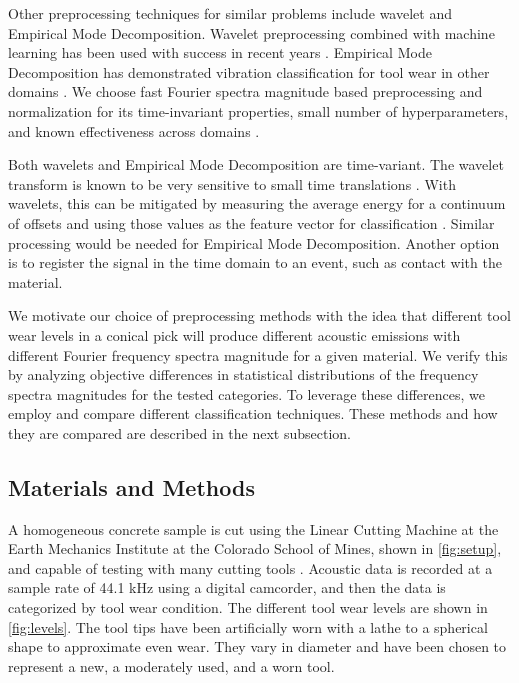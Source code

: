 Other preprocessing techniques for similar problems include wavelet and Empirical Mode Decomposition.
Wavelet preprocessing combined with machine learning
has been used with success in recent years 
 \cite{he2013vibration, sadegh2016classification, skariah2021health}.
Empirical Mode Decomposition has demonstrated vibration classification for tool wear
 in other domains \cite{Xu2009, Nie2011, Zhan2014}.
We choose fast Fourier spectra magnitude based preprocessing and normalization for its time-invariant properties,
small number of hyperparameters, and known effectiveness across domains \cite{Xu2016, Harlianto2022}.

Both wavelets and Empirical Mode Decomposition are time-variant.
The wavelet transform is known to be very sensitive to small time translations \cite{Yen1999}.
With wavelets, this can be mitigated by measuring the average energy for 
a continuum of offsets and using those values 
as the feature vector for classification \cite{Baccar2015}.
Similar processing would be needed for Empirical Mode Decomposition. 
Another option is to register the signal in the time domain to an event, such as contact with the material.

We motivate our choice of preprocessing methods with the idea that different tool wear levels in a conical pick
will produce different acoustic emissions with different Fourier frequency spectra magnitude for a given material. 
We verify this by analyzing objective differences in statistical distributions 
of the frequency spectra magnitudes for the tested categories.
To leverage these differences, we employ and compare different classification techniques.
These methods and how they are compared are described in the next subsection.

\subsection{Materials and Methods}\label{sec2}

A homogeneous concrete sample is cut using the Linear Cutting Machine
at the Earth Mechanics Institute at the Colorado School of Mines, shown in \ref{fig:setup},
and capable of testing with many cutting tools \cite{THYAGARAJAN2024105675}. 
Acoustic data is recorded at a sample rate of 44.1 kHz using a digital camcorder,
and then the data is categorized by tool wear condition.
The different tool wear levels are shown in \ref{fig:levels}.
The tool tips have been artificially worn with a lathe to a spherical shape to approximate even wear.
They vary in diameter and have been chosen to represent a new, a moderately used, and a worn tool.

